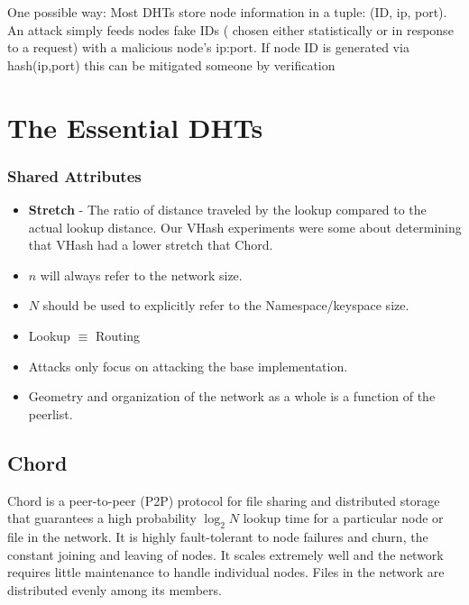 \documentclass[10pt,letterpaper]{report}
\begin{document}
One possible way:  Most DHTs store node information in a tuple: (ID, ip, port).  An attack simply feeds nodes fake IDs ( chosen either statistically or in response to a request) with a malicious node's ip:port.  If node ID is generated via hash(ip,port)  this can be mitigated someone by verification  




\chapter{The Essential DHTs}%

\subsection*{Shared Attributes}

\begin{itemize}
	\item \textbf{Stretch} \cite{hildrum2004distributed} - The ratio of distance traveled by the lookup compared to the actual lookup distance. Our VHash experiments were some about determining that VHash had a lower stretch that Chord.
	\item $n$ will always refer to the network size.
	\item $N$ should be used to explicitly refer to the Namespace/keyspace size.
	\item Lookup $\equiv $ Routing
	\item Attacks only focus on attacking the base implementation. 
	\item Geometry and organization of the network as a whole is a function of the peerlist.
	

\end{itemize}











\section{Chord}
Chord \cite{chord} is a peer-to-peer (P2P) protocol for file sharing and distributed storage that guarantees a high probability $\log_{2} N$ lookup time for a particular node or file in the network. 
It is highly fault-tolerant to node failures and churn, the constant joining and leaving of nodes.  It scales extremely well and the network requires little maintenance to handle individual nodes.  
Files in the network are distributed evenly among its members.
\end{document}

